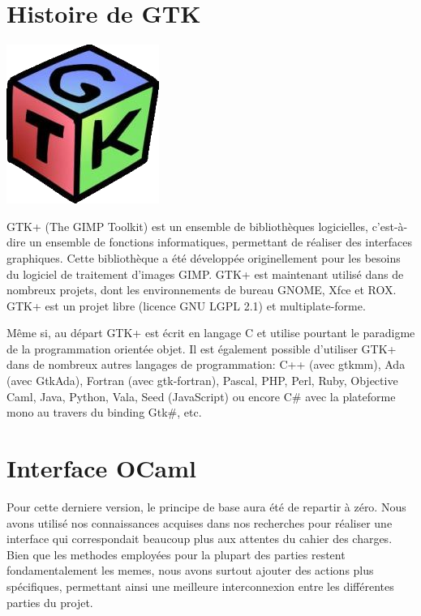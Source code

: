 \documentclass[12pt]{report}
\begin{document}
	\section {Histoire de GTK}

\begin{center}
\includegraphics[scale = 1]{GTK.png}
\end{center}

GTK+ (The GIMP Toolkit) est un ensemble de bibliothèques logicielles, c'est-à-dire un ensemble de fonctions informatiques, permettant de réaliser des interfaces graphiques. Cette bibliothèque a été développée originellement pour les besoins du logiciel de traitement d'images GIMP. GTK+ est maintenant utilisé dans de nombreux projets, dont les environnements de bureau GNOME, Xfce et ROX.
GTK+ est un projet libre (licence GNU LGPL 2.1) et multiplate-forme.

Même si, au départ GTK+ est écrit en langage C et utilise pourtant le paradigme de la programmation orientée objet. Il est également possible d'utiliser GTK+ dans de nombreux autres langages de programmation: C++ (avec gtkmm), Ada (avec GtkAda), Fortran (avec gtk-fortran), Pascal, PHP, Perl, Ruby, Objective Caml, Java, Python, Vala, Seed (JavaScript) ou encore C\# avec la plateforme mono au travers du binding Gtk\#, etc.

	\section{Interface OCaml}

Pour cette derniere version, le principe de base aura été de repartir à zéro. Nous avons utilisé nos connaissances acquises dans nos recherches pour réaliser une interface qui correspondait beaucoup plus aux attentes du cahier des charges. Bien que les methodes employées pour la plupart des parties restent fondamentalement les memes, nous avons surtout ajouter des actions plus spécifiques, permettant ainsi une meilleure interconnexion entre les différentes parties du projet.
\end{document}
